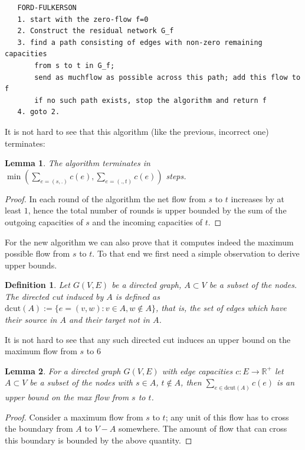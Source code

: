 \documentclass{article}
\newtheorem{definition}{Definition}
\newtheorem{lemma}{Lemma}
\begin{document}
\begin{verbatim}
   FORD-FULKERSON
   1. start with the zero-flow f=0
   2. Construct the residual network G_f
   3. find a path consisting of edges with non-zero remaining capacities 
       from s to t in G_f;
       send as muchflow as possible across this path; add this flow to f
       if no such path exists, stop the algorithm and return f
   4. goto 2.
\end{verbatim}

It is not hard to see that this algorithm (like the previous, incorrect one) terminates:

\begin{lemma}
The algorithm terminates in $\min\left(\sum_{e=(s,.)} c(e), \sum_{e=(.,t)} c(e)\right)$ steps.
\end{lemma}
\begin{proof}
In each round of the algorithm the net flow from $s$ to $t$ increases by at least $1$, hence
the total number of rounds is upper bounded by the sum of the outgoing capacities of $s$ and
the incoming capacities of $t$.
\end{proof}

For the new algorithm we can also prove that it computes indeed the maximum possible flow from $s$ to $t$.
To that end we first need a simple observation to derive upper bounds.

\begin{definition}
Let $G(V,E)$ be a directed graph, $A\subset V$  be a subset of the nodes.
The \emph{directed cut} induced by $A$ is defined as $\mbox{dcut}(A):=\{e=(v,w): v\in A, w\notin A\}$, that is,
the set of edges which have their source in $A$ and their target not in $A$.
\end{definition}

It is not hard to see that any such directed cut induces an upper bound on the maximum flow from $s$ to $6$
\begin{lemma}
For a directed graph $G(V,E)$ with edge capacities $c:E\rightarrow \mathbb{R}^+$ let $A\subset V$ be a subset of the nodes with $s\in A$, $t\notin A$, then $\sum_{e\in\mbox{dcut}(A)} c(e)$ is an upper bound on the max flow from $s$ to $t$.
\end{lemma}
\begin{proof}
Consider a maximum flow from $s$ to $t$; any unit of this flow has to cross the boundary from $A$ to $V-A$ somewhere. The amount of flow that can cross this boundary is bounded by the above quantity.
\end{proof}
\end{document}
